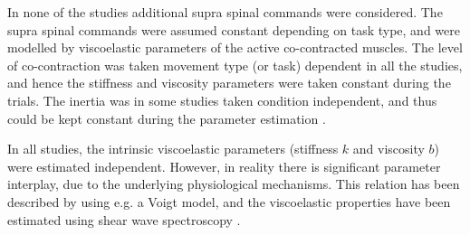 In none of the studies additional supra spinal commands were considered. The supra spinal commands were assumed constant depending on task type, and were modelled by viscoelastic parameters of the active co-contracted muscles. The level of co-contraction was taken movement type (or task) dependent in all the studies, and hence the stiffness and viscosity parameters were taken constant during the trials. The inertia was in some studies taken condition independent, and thus could be kept constant during the parameter estimation \cite{zhang_simultaneous_1997, van_der_helm_identification_2002, mugge_sensory_2009}.


In all studies, the intrinsic viscoelastic parameters (stiffness $k$ and viscosity $b$) were estimated independent. However, in reality there is significant parameter interplay, due to the underlying physiological mechanisms. This relation has been described by using e.g. a Voigt model, and the viscoelastic properties have been estimated using shear wave spectroscopy \cite{gennisson_viscoelastic_2010}. 









